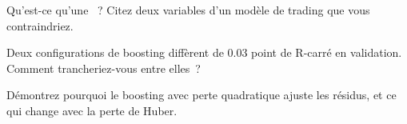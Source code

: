 \begin{interviewq}\label{iq:ml:trees-and-boosting:4}
Qu'est-ce qu'une ~? Citez deux variables d'un modèle de trading que vous contraindriez.
\end{interviewq}

\begin{interviewq}\label{iq:ml:trees-and-boosting:5}
Deux configurations de boosting diffèrent de 0.03 point de R-carré en validation. Comment trancheriez-vous entre elles~?
\end{interviewq}

\begin{interviewq}\label{iq:ml:trees-and-boosting:6}
Démontrez pourquoi le boosting avec perte quadratique ajuste les résidus, et ce qui change avec la perte de Huber.
\end{interviewq}
